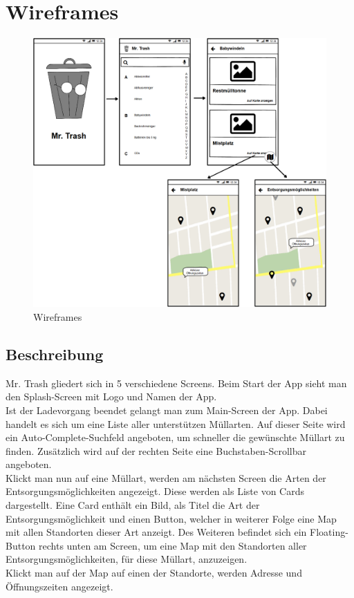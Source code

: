 \documentclass[12pt, a4paper]{scrreprt}
\begin{document}
\section{Wireframes}
\begin{figure}[h]
\centering
\includegraphics[width=16cm]{../graphical/wireframes.png}
\caption{\label{fig:art1} Wireframes}
\end{figure}

\subsection{Beschreibung}
Mr. Trash gliedert sich in 5 verschiedene Screens. Beim Start der App sieht man den Splash-Screen mit Logo und Namen der App. \\
Ist der Ladevorgang beendet gelangt man zum Main-Screen der App. Dabei handelt es sich um eine Liste aller unterstützen Müllarten. Auf dieser Seite wird ein Auto-Complete-Suchfeld angeboten, um schneller die gewünschte Müllart zu finden. Zusätzlich wird auf der rechten Seite eine Buchstaben-Scrollbar angeboten.\\
Klickt man nun auf eine Müllart, werden am nächsten Screen die Arten der Entsorgungsmöglichkeiten angezeigt. Diese werden als Liste von Cards dargestellt. Eine Card enthält ein Bild, als Titel die Art der Entsorgungsmöglichkeit und einen Button, welcher in weiterer Folge eine Map mit allen Standorten dieser Art anzeigt. Des Weiteren befindet sich ein Floating-Button rechts unten am Screen, um eine Map mit den Standorten aller Entsorgungsmöglichkeiten, für diese Müllart, anzuzeigen.\\
Klickt man auf der Map auf einen der Standorte, werden Adresse und Öffnungszeiten angezeigt.
\end{document}
